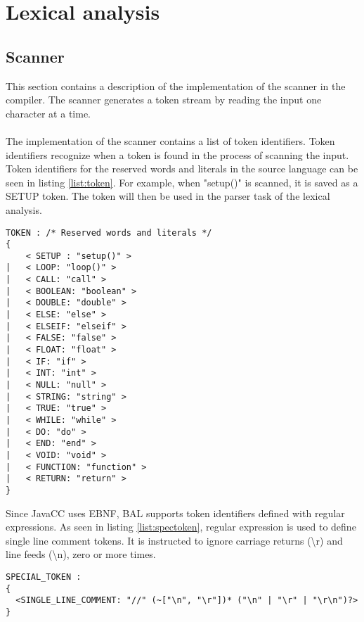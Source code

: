 \section{Lexical analysis}
\subsection{Scanner}
This section contains a description of the implementation of the scanner in the compiler. The scanner generates a token stream by reading the input one character at a time.\\
\\The implementation of the scanner contains a list of token identifiers. Token identifiers recognize when a token is found in the process of scanning the input. Token identifiers for the reserved words and literals in the source language can be seen in listing \ref{list:token}. For example, when "setup()" is scanned, it is saved as a SETUP token. The token will then be used in the parser task of the lexical analysis. 

\begin{lstlisting}[caption=Token identifiers for reserved words and literals, label=list:token]
TOKEN : /* Reserved words and literals */
{
	< SETUP : "setup()" >
|	< LOOP: "loop()" >	
|	< CALL: "call" >
|	< BOOLEAN: "boolean" >
|	< DOUBLE: "double" >
|	< ELSE: "else" >
|	< ELSEIF: "elseif" >
|	< FALSE: "false" >
|	< FLOAT: "float" >
|	< IF: "if" >
|	< INT: "int" >
|	< NULL: "null" >
|	< STRING: "string" >
|	< TRUE: "true" >
|	< WHILE: "while" >
| 	< DO: "do" >
| 	< END: "end" >
|   < VOID: "void" >
|   < FUNCTION: "function" >
|   < RETURN: "return" >
}

\end{lstlisting}
Since JavaCC uses EBNF, BAL supports token identifiers defined with regular expressions. As seen in listing \ref{list:spectoken}, regular expression is used to define single line comment tokens. It is instructed to ignore carriage returns (\textbackslash{r}) and line feeds (\textbackslash{n}), zero or more times. 

\begin{lstlisting}[caption=Special token for single line comment, label=list:spectoken]
SPECIAL_TOKEN :
{
  <SINGLE_LINE_COMMENT: "//" (~["\n", "\r"])* ("\n" | "\r" | "\r\n")?>
}
\end{lstlisting}


 
